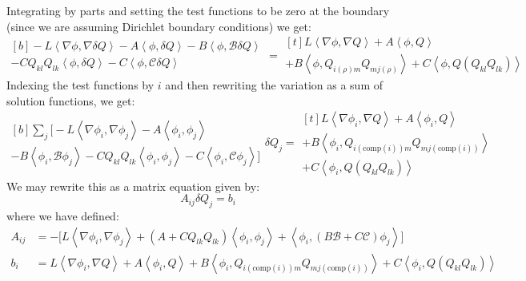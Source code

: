 \documentclass[reqno]{article}
\begin{document}
	Integrating by parts and setting the test functions to be zero at the boundary (since we are assuming Dirichlet boundary conditions) we get:
	\begin{equation}
		\begin{multlined}[b]
		- L \left< \nabla \phi, \nabla \delta Q \right>
		- A \left< \phi, \delta Q \right>
		- B \left< \phi, \mathcal{B} \delta Q \right> \\
		- C Q_{kl} Q_{lk} \left< \phi, \delta Q \right>
		- C \left< \phi, \mathcal{C} \delta Q \right>
		\end{multlined}
		=
		\begin{multlined}[t]
		L \left< \nabla \phi, \nabla Q \right>
		+ A \left< \phi, Q \right> \\
		+ B \left< \phi, Q_{i (\rho) m} Q_{m j (\rho)} \right>
		+ C \left< \phi, Q (Q_{kl} Q_{lk}) \right>
		\end{multlined}
	\end{equation}
	Indexing the test functions by $i$ and then rewriting the variation as a sum of solution functions, we get:
	\begin{equation}
		\begin{multlined}[b]
		\sum_j
		\bigl[
		-L \left< \nabla \phi_i, \nabla \phi_j \right>
		- A \left< \phi_i, \phi_j \right> \\
		- B \left< \phi_i, \mathcal{B} \phi_j \right> 
		- C Q_{kl} Q_{lk} \left< \phi_i, \phi_j \right>
		- C \left< \phi_i, \mathcal{C} \phi_j \right>
		\bigr]
		\end{multlined}
		\delta Q_{j}
		=
		\begin{multlined}[t]
		L \left< \nabla \phi_i, \nabla Q \right>
		+ A \left< \phi_i, Q \right> \\
		+ B \left< \phi_i, Q_{i (\text{comp}(i)) m} Q_{m j (\text{comp}(i))}\right> \\
		+ C \left< \phi_i, Q (Q_{kl} Q_{lk}) \right>
		\end{multlined}
	\end{equation}
	We may rewrite this as a matrix equation given by:
	\begin{equation}
		A_{ij} \delta Q_j = b_i
	\end{equation}
	where we have defined:
	\begin{align}
		A_{ij} &= - \bigl[
		L \left< \nabla \phi_i, \nabla \phi_j \right>
		+ (A + C Q_{lk} Q_{lk}) \left< \phi_i, \phi_j \right>
		+ \left< \phi_i, (B \mathcal{B} + C \mathcal{C}) \phi_j \right>
		\bigr] \\
		b_i &=
		L \left< \nabla \phi_i, \nabla Q \right>
		+ A \left< \phi_i, Q \right>
		+ B \left< \phi_i, Q_{i (\text{comp}(i)) m} Q_{m j (\text{comp}(i))} \right>
		+ C \left< \phi_i, Q (Q_{kl} Q_{lk}) \right>
	\end{align}
	
	
\end{document}
